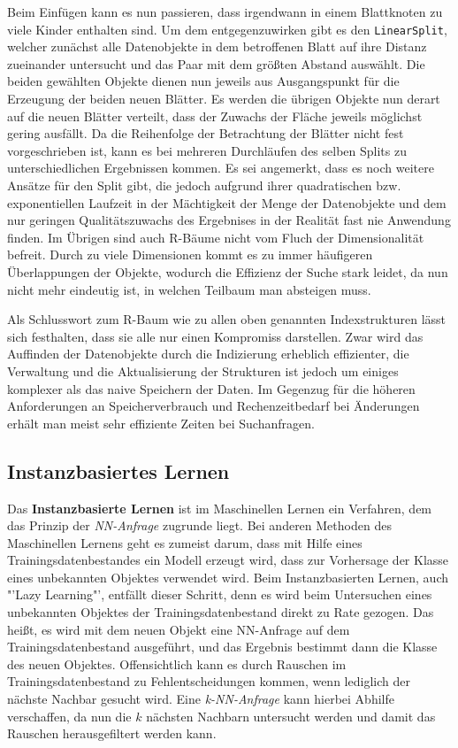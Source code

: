 Beim Einfügen kann es nun passieren, dass irgendwann in einem Blattknoten zu
viele Kinder enthalten sind. Um dem entgegenzuwirken gibt es den
\texttt{LinearSplit}, welcher zunächst alle Datenobjekte in dem betroffenen Blatt
auf ihre Distanz zueinander untersucht und das Paar mit dem größten Abstand
auswählt. Die beiden gewählten Objekte dienen nun jeweils aus Ausgangspunkt für
die Erzeugung der beiden neuen Blätter. Es werden die übrigen Objekte nun derart
auf die neuen Blätter verteilt, dass der Zuwachs der Fläche jeweils möglichst gering
ausfällt. Da die Reihenfolge der Betrachtung der Blätter nicht fest vorgeschrieben
ist, kann es bei mehreren Durchläufen des selben Splits zu unterschiedlichen
Ergebnissen kommen.  Es sei angemerkt, dass es noch weitere Ansätze für den
Split gibt, die jedoch aufgrund ihrer quadratischen bzw. exponentiellen Laufzeit
in der Mächtigkeit der Menge der Datenobjekte und dem nur geringen Qualitätszuwachs
des Ergebnises in der Realität fast nie Anwendung finden. 
Im Übrigen sind auch R-Bäume nicht vom Fluch der Dimensionalität befreit. Durch
zu viele Dimensionen kommt es zu immer häufigeren Überlappungen der Objekte,
wodurch die Effizienz der Suche stark leidet, da nun nicht mehr eindeutig ist,
in welchen Teilbaum man absteigen muss.

Als Schlusswort zum R-Baum wie zu allen oben genannten Indexstrukturen lässt
sich festhalten, dass sie alle nur einen Kompromiss darstellen. Zwar wird das
Auffinden der Datenobjekte durch die Indizierung erheblich effizienter, die
Verwaltung und die Aktualisierung der Strukturen ist jedoch um einiges komplexer
als das naive Speichern der Daten. Im Gegenzug für die höheren Anforderungen an
Speicherverbrauch und Rechenzeitbedarf bei Änderungen erhält man meist sehr effiziente
Zeiten bei Suchanfragen.


\subsection{Instanzbasiertes Lernen}
Das \textbf{Instanzbasierte Lernen} ist im Maschinellen Lernen ein Verfahren, dem
das Prinzip der \textit{NN-Anfrage} zugrunde liegt. Bei anderen Methoden des
Maschinellen Lernens geht es zumeist darum, dass mit Hilfe eines Trainingsdatenbestandes
ein Modell erzeugt wird, dass zur Vorhersage der Klasse eines unbekannten Objektes
verwendet wird. Beim Instanzbasierten Lernen, auch "'Lazy Learning"', entfällt
dieser Schritt, denn es wird beim Untersuchen eines unbekannten Objektes der
Trainingsdatenbestand direkt zu Rate gezogen. Das heißt, es wird mit dem neuen
Objekt eine NN-Anfrage auf dem Trainingsdatenbestand ausgeführt, und das Ergebnis
bestimmt dann die Klasse des neuen Objektes. Offensichtlich kann es durch Rauschen im
Trainingsdatenbestand zu Fehlentscheidungen kommen, wenn lediglich der nächste Nachbar
gesucht wird. Eine \textit{k-NN-Anfrage} kann hierbei Abhilfe verschaffen, da nun die
\(k\) nächsten Nachbarn untersucht werden und damit das Rauschen herausgefiltert werden
kann.

